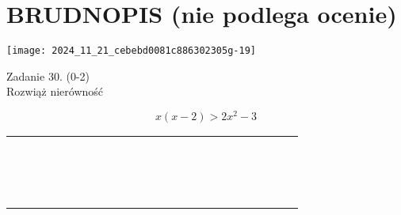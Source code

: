 \documentclass[10pt]{article}
\begin{document}
\section*{BRUDNOPIS (nie podlega ocenie)}
\begin{center}
\texttt{[image: 2024\_11\_21\_cebebd0081c886302305g-19]}
\end{center}

Zadanie 30. (0-2)\\
Rozwiąż nierówność

\[
x(x-2)>2 x^{2}-3
\]

\begin{center}
\begin{tabular}{|c|c|c|c|c|c|c|c|c|c|c|c|c|c|c|c|c|c|c|c|c|c|c|}
\hline
 &  &  &  &  &  &  &  &  &  &  &  &  &  &  &  &  &  &  &  &  &  &  \\
\hline
 &  &  &  &  &  &  &  &  &  &  &  &  &  &  &  &  &  &  &  &  &  &  \\
\hline
 &  &  &  &  &  &  &  &  &  &  &  &  &  &  &  &  &  &  &  &  &  &  \\
\hline
 &  &  &  &  &  &  &  &  &  &  &  &  &  &  &  &  &  &  &  &  &  &  \\
\hline
 &  &  &  &  &  &  &  &  &  &  &  &  &  &  &  &  &  &  &  &  &  &  \\
\hline
 &  &  &  &  &  &  &  &  &  &  &  &  &  &  &  &  &  &  &  &  &  &  \\
\hline
 &  &  &  &  &  &  &  &  &  &  &  &  &  &  &  &  &  &  &  &  &  &  \\
\hline
 &  &  &  &  &  &  &  &  &  &  &  &  &  &  &  &  &  &  &  &  &  &  \\
\hline
 &  &  &  &  &  &  &  &  &  &  &  &  &  &  &  &  &  &  &  &  &  &  \\
\hline
 &  &  &  &  &  &  &  &  &  &  &  &  &  &  &  &  &  &  &  &  &  &  \\
\hline
 &  &  &  &  &  &  &  &  &  &  &  &  &  &  &  &  &  &  &  &  &  &  \\
\hline
 &  &  &  &  &  &  &  &  &  &  &  &  &  &  &  &  &  &  &  &  &  &  \\
\hline
 &  &  &  &  &  &  &  &  &  &  &  &  &  &  &  &  &  &  &  &  &  &  \\
\hline
 &  &  &  &  &  &  &  &  &  &  &  &  &  &  &  &  &  &  &  &  &  &  \\
\hline
 &  &  &  &  &  &  &  &  &  &  &  &  &  &  &  &  &  &  &  &  &  &  \\
\hline
 &  &  &  &  &  &  &  &  &  &  &  &  &  &  &  &  &  &  &  &  &  &  \\

\end{tabular}
\end{center}
\end{document}
